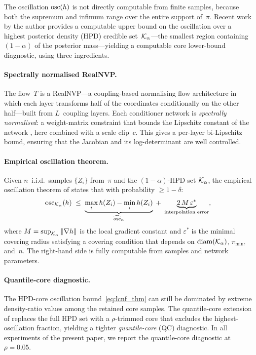 The oscillation $\mathrm{osc}(h)$ is not directly computable from
finite samples, because both the supremum and infimum range
over the entire support of~$\pi$.  Recent work by the author
\citep{LCNF} provides a computable upper bound on the
oscillation over a highest posterior density (HPD) credible
set~$\mathcal{K}_\alpha$---the smallest region containing
$(1{-}\alpha)$ of the posterior mass---yielding a
computable core lower-bound diagnostic, using three ingredients.

\paragraph{Spectrally normalised RealNVP.}
The flow~$T$ is a RealNVP---a coupling-based normalising flow
architecture \citep{DinhSohlDickstein2017} in which each layer transforms
half of the coordinates conditionally on the other half---built
from $L$~coupling layers.  Each conditioner network is
\emph{spectrally normalised}: a weight-matrix constraint that
bounds the Lipschitz constant of the network
\citep{Miyato2018}, here combined with a scale clip~$c$.
This gives a per-layer bi-Lipschitz bound, ensuring that the
Jacobian and its log-determinant are well controlled.

\paragraph{Empirical oscillation theorem.}
Given $n$~i.i.d.\ samples $\{Z_i\}$ from~$\pi$ and the
$(1{-}\alpha)$-HPD set $\mathcal{K}_\alpha$, the empirical oscillation
theorem of \citet{LCNF} states
that with probability $\geq 1 - \delta$:
\begin{equation}\label{eq:lcnf_thm}
  \mathrm{osc}_{\mathcal{K}_\alpha}(h)
  \;\leq\;
  \underbrace{\max_i h(Z_i) - \min_i h(Z_i)}_{\widehat{\mathrm{osc}}_n}
  \;+\;
  \underbrace{2\,M\,\varepsilon^*}_{\text{interpolation error}},
\end{equation}
where $M = \sup_{\mathcal{K}_\alpha}\|\nabla h\|$ is the local gradient
constant and $\varepsilon^*$ is the minimal covering radius
satisfying a covering condition that depends on
$\mathrm{diam}(\mathcal{K}_\alpha)$, $\pi_{\min}$, and~$n$.
The right-hand side is fully computable from samples and
network parameters.

\paragraph{Quantile-core diagnostic.}
The HPD-core oscillation bound~\eqref{eq:lcnf_thm}
can still be dominated by extreme density-ratio values
among the retained core samples.  The quantile-core extension
of \citet{CerTMCMC} replaces the full HPD set with a
$\rho$-trimmed core that excludes the highest-oscillation
fraction, yielding a tighter \emph{quantile-core} (QC) diagnostic.
In all experiments of the present paper, we report the
quantile-core diagnostic at $\rho = 0.05$.


